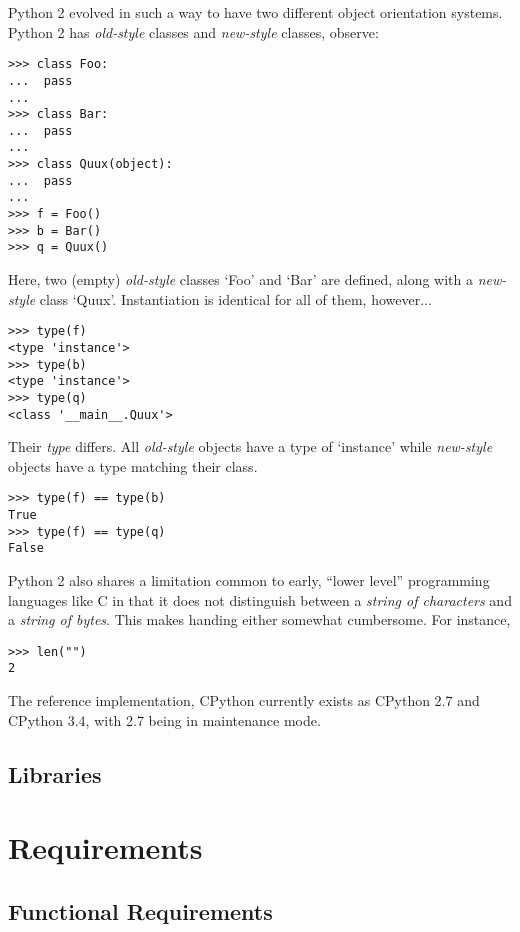 \documentclass[10pt,a4paper,notitlepage]{report}
\begin{document}
Python 2 evolved in such a way to have two different object orientation systems. Python 2 has \emph{old-style} classes and \emph{new-style} classes, observe:

\begin{lstlisting}[language={[2]Python}]
>>> class Foo:
...  pass
... 
>>> class Bar:
...  pass
... 
>>> class Quux(object):
...  pass
... 
>>> f = Foo()
>>> b = Bar()
>>> q = Quux()
\end{lstlisting}

Here, two (empty) \emph{old-style} classes `Foo' and `Bar' are defined, along with a \emph{new-style} class `Quux'. Instantiation is identical for all of them, however...

\begin{lstlisting}[language={[2]Python}]
>>> type(f)
<type 'instance'>
>>> type(b)
<type 'instance'>
>>> type(q)
<class '__main__.Quux'>
\end{lstlisting}

Their \emph{type} differs. All \emph{old-style} objects have a type of `instance' while \emph{new-style} objects have a type matching their class.

\begin{lstlisting}[language={[2]Python}]
>>> type(f) == type(b)
True
>>> type(f) == type(q)
False
\end{lstlisting}

Python 2 also shares a limitation common to early, ``lower level'' programming languages like C in that it does not distinguish between a \emph{string of characters} and a \emph{string of bytes}. This makes handing either somewhat cumbersome. For instance,

\begin{lstlisting}[language={[2]Python}]
>>> len("")
2
\end{lstlisting}

The reference implementation, CPython currently exists as CPython 2.7 and CPython 3.4, with 2.7 being in maintenance mode\cite{cpy2maint}.
\section{Libraries}

\chapter{Requirements}
\section{Functional Requirements}
\end{document}
